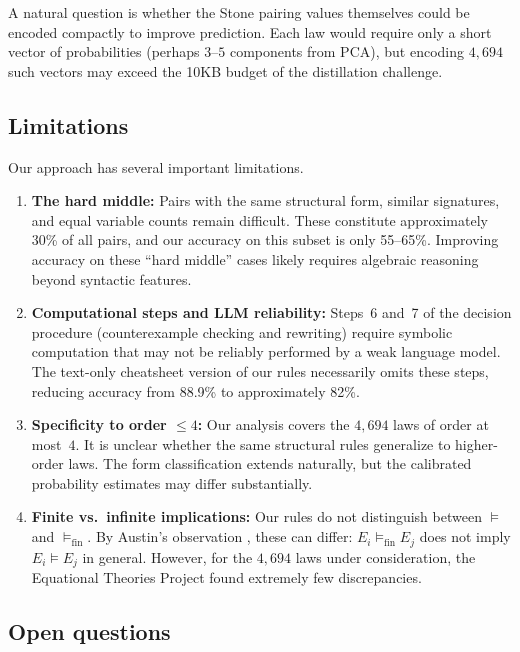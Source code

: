 A natural question is whether the Stone pairing values themselves could be
encoded compactly to improve prediction.  Each law would require only a short
vector of probabilities (perhaps $3$--$5$ components from PCA), but encoding
$4{,}694$ such vectors may exceed the 10KB budget of the distillation challenge.

\subsection{Limitations}

Our approach has several important limitations.

\begin{enumerate}[label=(\roman*)]
\item \textbf{The hard middle:} Pairs with the same structural form, similar
  signatures, and equal variable counts remain difficult.  These constitute
  approximately 30\% of all pairs, and our accuracy on this subset is only
  55--65\%.  Improving accuracy on these ``hard middle'' cases likely requires
  algebraic reasoning beyond syntactic features.

\item \textbf{Computational steps and LLM reliability:} Steps~6 and~7 of the
  decision procedure (counterexample checking and rewriting) require symbolic
  computation that may not be reliably performed by a weak language model.
  The text-only cheatsheet version of our rules necessarily omits these steps,
  reducing accuracy from 88.9\% to approximately 82\%.

\item \textbf{Specificity to order $\le 4$:} Our analysis covers the $4{,}694$
  laws of order at most~$4$.  It is unclear whether the same structural rules
  generalize to higher-order laws.  The form classification extends naturally,
  but the calibrated probability estimates may differ substantially.

\item \textbf{Finite vs.\ infinite implications:} Our rules do not distinguish
  between $\models$ and $\models_{\mathrm{fin}}$.  By Austin's observation
  \cite{Austin1965}, these can differ: $E_i \models_{\mathrm{fin}} E_j$ does
  not imply $E_i \models E_j$ in general.  However, for the $4{,}694$ laws
  under consideration, the Equational Theories Project found extremely few
  discrepancies.
\end{enumerate}

\subsection{Open questions}

